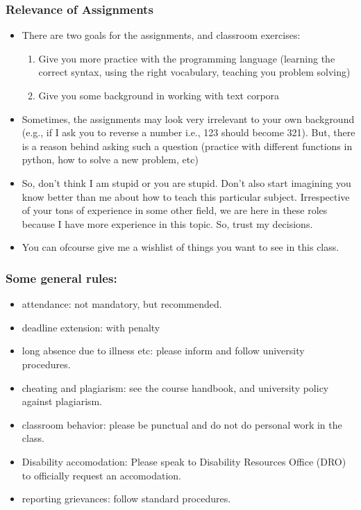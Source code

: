 \documentclass{beamer}
\begin{document}
\begin{frame}
\frametitle{Relevance of Assignments}
\begin{itemize}
\item There are two goals for the assignments, and classroom exercises:
\begin{enumerate}
\item Give you more practice with the programming language (learning the correct syntax, using the right vocabulary, teaching you problem solving)
\item Give you some background in working with text corpora  
\end{enumerate}
\pause \item Sometimes, the assignments may look very irrelevant to your own background (e.g., if I ask you to reverse a number i.e., 123 should become 321). But, there is a reason behind asking such a question (practice with different functions in python, how to solve a new problem, etc)
\item \pause So, don't think I am stupid or you are stupid. Don't also start imagining you know better than me about how to teach this particular subject. Irrespective of your tons of experience in some other field, we are here in these roles because I have more experience in this topic. So, trust my decisions.
\item You can ofcourse give me a wishlist of things you want to see in this class. 
\end{itemize}
\end{frame}

\begin{frame}
\frametitle{Some general rules:}
\begin{itemize}
\item attendance: not mandatory, but recommended.
\item deadline extension: with penalty
\item long absence due to illness etc: please inform and follow university procedures.
\item cheating and plagiarism: see the course handbook, and university policy against plagiarism.
\item classroom behavior: please be punctual and do not do personal work in the class.
\item Disability accomodation: Please speak to Disability Resources Office (DRO) to officially request an accomodation.
\item reporting grievances: follow standard procedures. 
\end{itemize}
\end{frame}
\end{document}
